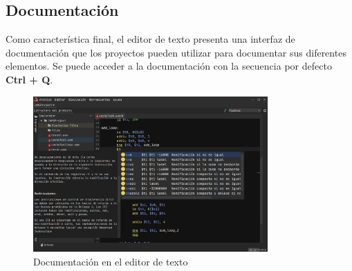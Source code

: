 \subsection{Documentación}\label{subsec:documentacion}

Como característica final, el editor de texto presenta
una interfaz de documentación que los proyectos
pueden utilizar para documentar sus diferentes
elementos.
Se puede acceder a la documentación con la secuencia por defecto
\textbf{Ctrl + Q}.

\begin{figure}[H]
    \centering
    \includegraphics[width=0.8\textwidth]{images/base/jams-documentation}
    \caption{Documentación en el editor de texto}
    \label{fig:jams-documentacion}
\end{figure}